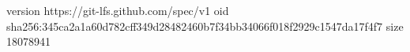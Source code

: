 version https://git-lfs.github.com/spec/v1
oid sha256:345ca2a1a60d782cff349d28482460b7f34bb34066f018f2929c1547da17f4f7
size 18078941
